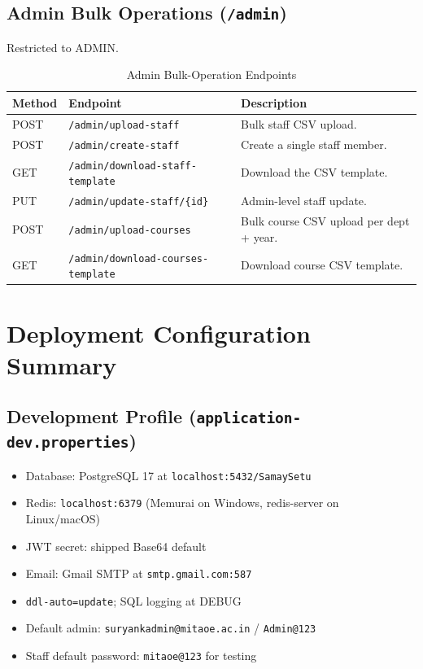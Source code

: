 \subsection{Admin Bulk Operations (\texttt{/admin})}
Restricted to ADMIN.
\begin{table}[H]
    \centering
    \renewcommand{\arraystretch}{1.4}
    \begin{tabular}{|p{1.8cm}|p{5.3cm}|p{6.5cm}|}
        \hline
        \textbf{Method} & \textbf{Endpoint} & \textbf{Description} \\
        \hline
        POST & \texttt{/admin/upload-staff} & Bulk staff CSV upload. \\
        \hline
        POST & \texttt{/admin/create-staff} & Create a single staff member. \\
        \hline
        GET & \texttt{/admin/download-staff-template} & Download the CSV template. \\
        \hline
        PUT & \texttt{/admin/update-staff/\{id\}} & Admin-level staff update. \\
        \hline
        POST & \texttt{/admin/upload-courses} & Bulk course CSV upload per dept + year. \\
        \hline
        GET & \texttt{/admin/download-courses-template} & Download course CSV template. \\
        \hline
    \end{tabular}
    \caption{Admin Bulk-Operation Endpoints}
    \label{tab:api_admin_bulk}
\end{table}

\section{Deployment Configuration Summary}

\subsection{Development Profile (\texttt{application-dev.properties})}
\begin{itemize}
    \item Database: PostgreSQL 17 at \texttt{localhost:5432/SamaySetu}
    \item Redis: \texttt{localhost:6379} (Memurai on Windows, redis-server on Linux/macOS)
    \item JWT secret: shipped Base64 default
    \item Email: Gmail SMTP at \texttt{smtp.gmail.com:587}
    \item \texttt{ddl-auto=update}; SQL logging at DEBUG
    \item Default admin: \texttt{suryankadmin@mitaoe.ac.in} / \texttt{Admin@123}
    \item Staff default password: \texttt{mitaoe@123} for testing
\end{itemize}

